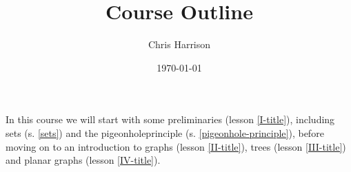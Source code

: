 \documentclass[11pt,a4paper]{article}
\title{Course Outline}
\author{Chris Harrison}
\date{\today}
\begin{document}
\maketitle 

In this course we will start with some preliminaries (lesson \ref{I-title}), including sets (s. \ref{sets}) and the pigeonholeprinciple (s. \ref{pigeonhole-principle}), before moving on to an introduction to graphs (lesson \ref{II-title}), trees (lesson \ref{III-title}) and planar graphs (lesson \ref{IV-title}).
\end{document}
